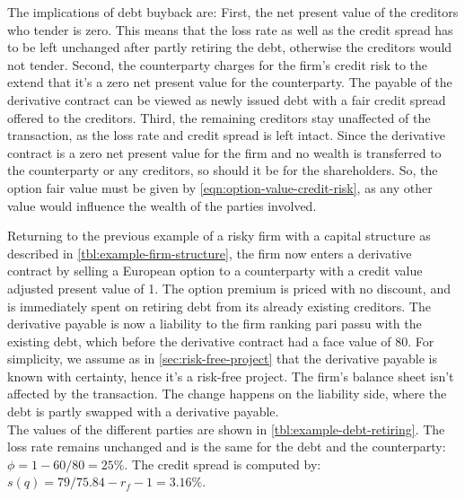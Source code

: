 \documentclass[../main.tex]{subfiles}
\begin{document}
            The implications of debt buyback are: 
            First, the net present value of the creditors who tender is zero. 
            This means that the loss rate as well as the credit spread has to be left unchanged
            after partly retiring the debt, otherwise the creditors would not tender. 
            Second, the counterparty charges for the firm's credit risk 
            to the extend that it's a zero net present value for the counterparty. 
            The payable of the derivative contract can be viewed as newly issued debt
             with a fair credit spread offered to the creditors.
            Third, the remaining creditors stay unaffected of the transaction, 
            as the loss rate and credit spread is left intact. 
            Since the derivative contract is a zero net present value for the firm 
            and no wealth is transferred to the counterparty or any creditors, 
            so should it be for the shareholders. 
            So, the option fair value must be given by \cref{eqn:option-value-credit-risk},
            as any other value would influence the wealth of the parties involved.

            Returning to the previous example of a risky firm with a capital structure
            as described in \cref{tbl:example-firm-structure}, 
            the firm now enters a derivative contract by selling a European option to a counterparty
            with a credit value adjusted present value of 1. 
            The option premium is priced with no discount, 
            and is immediately spent on retiring debt from its already existing creditors. 
            The derivative payable is now a liability to the firm ranking pari passu with the existing debt, 
            which before the derivative contract had a face value of 80. 
            For simplicity, we assume as in \cref{sec:risk-free-project}
            that the derivative payable is known with certainty, hence it's a risk-free project. 
            The firm's balance sheet isn't affected by the transaction. 
            The change happens on the liability side, where the debt is partly swapped with a derivative payable.\\
            The values of the different parties are shown in \cref{tbl:example-debt-retiring}. 
            The loss rate remains unchanged and is the same for the debt and the counterparty: $\phi=1-60/80=25\%$. 
            The credit spread is computed by: $s(q)=79/75.84-r_{f}-1=3.16\%$.
            
\end{document}
